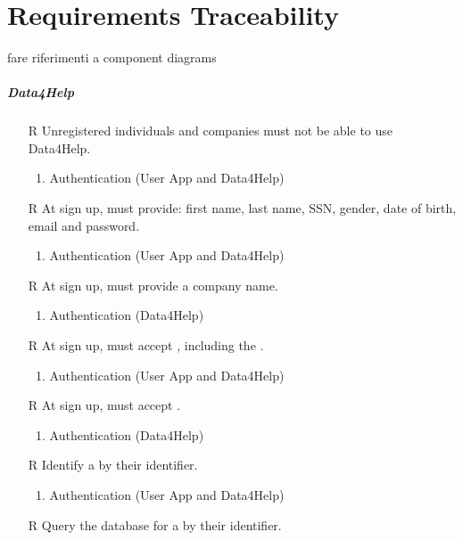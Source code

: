 
\chapter{Requirements Traceability}
 fare riferimenti a component diagrams

\paragraph{Data4Help}
\begin{itemize}
	\item[R\subs{1}]Unregistered individuals and companies must not be able to use Data4Help.
	\begin{enumerate}
		\item Authentication (User App and Data4Help)
	\end{enumerate}
	\item[R\subs{2}]At sign up,  must provide: first name, last name, SSN, gender, date of birth, email and password.
	\begin{enumerate}
		\item Authentication (User App and Data4Help)
	\end{enumerate}
	\item[R\subs{3}]At sign up,  must provide a company name.
	\begin{enumerate}
		\item Authentication (Data4Help)
	\end{enumerate}
	\item[R\subs{4}]At sign up,  must accept , including the .
	\begin{enumerate}
		\item Authentication (User App and Data4Help)
	\end{enumerate}
	\item[R\subs{5}]At sign up,  must accept .
	\begin{enumerate}
		\item Authentication (Data4Help)
	\end{enumerate}
	\item[R\subs{6}]Identify a  by their identifier.
	\begin{enumerate}
		\item Authentication (User App and Data4Help)
	\end{enumerate}
	\item[R\subs{7}]Query the database for a  by their identifier.

\end{itemize}

